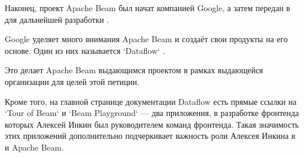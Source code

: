 
Наконец, проект Apache Beam был начат компанией Google, а затем передан
в \Asf для дальнейшей разработки .

Google уделяет много внимания Apache Beam и создаёт свои продукты на его основе.
Один из них называется `Dataflow` .

Это делает Apache Beam выдающимся проектом в рамках выдающейся организации
для целей этой петиции.

Кроме того, на главной странице документации Dataflow есть прямые ссылки
на `Tour of Beam` и `Beam Playground`  — два приложения, в разработке фронтенда которых Алексей Инкин был руководителем команд фронтенда.
Такая значимость этих приложений дополнительно подчеркивает
важность роли Алексея Инкина в \Asf и Apache Beam.
